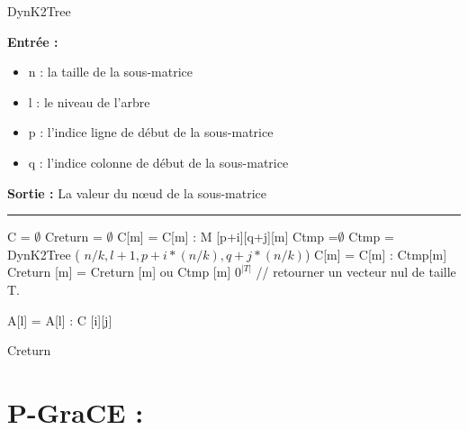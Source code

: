 \documentclass[a4paper,oneside,12pt]{report}
\theoremstyle{definition}
\begin{document}
	
					\begin{algorithm}[H]
					\label{alg:dynk2_tree}
					\caption{DynK2Tree}
					\textbf{Entrée :}
						\begin{itemize}[label=$\bullet$]
							\item n : la taille de la sous-matrice
							\item l : le niveau de l'arbre
							\item p : l'indice ligne de début de la sous-matrice
							\item q : l'indice colonne de début de la sous-matrice
						\end{itemize}
					\textbf{Sortie :} La valeur du nœud de la sous-matrice\\							\noindent\rule{\textwidth}{1pt}
						
						
				\begin{algorithmic} [1]
					\STATE C = $ \emptyset$
					\STATE Creturn  = $ \emptyset$
									\STATE C[m] = C[m] : M [p+i][q+j][m]
								\ENDFOR
							\ELSE
								\STATE Ctmp =$\emptyset$
								\STATE  Ctmp = DynK2Tree ( $n/k,l+1,p+i*(n/k), q+j*(n/k)$)
									\STATE C[m] = C[m] : Ctmp[m]
									\STATE Creturn [m] = Creturn [m] ou Ctmp [m]
								\ENDFOR
							\ENDIF
						\ENDFOR
					\ENDFOR
						\RETURN $0^{|T|}$ // retourner un vecteur nul de taille T.
					\ENDIF
					
					
					
								\STATE A[l] = A[l] : C [i][j]
							\ENDIF
						\ENDFOR
					\ENDFOR
	
					 \RETURN Creturn
					
				\end{algorithmic}
			\end{algorithm}
			
			
	
	
	
	\section{P-GraCE :}
	
\end{document}
